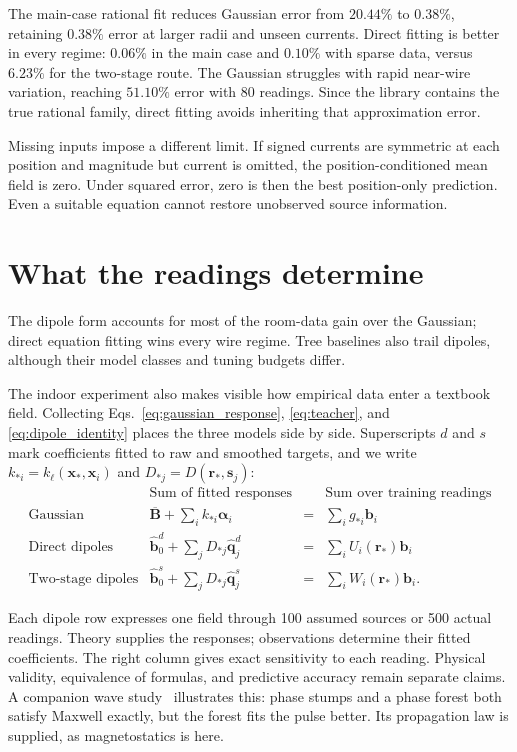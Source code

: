 \documentclass[11pt]{article}
\newcommand{\B}{\mathbf B}
\newcommand{\x}{\mathbf x}
\newcommand{\rr}{\mathbf r}
\newcommand{\bvec}{\mathbf b}
\begin{document}
The main-case rational fit reduces Gaussian error from \(20.44\%\) to
\(0.38\%\), retaining \(0.38\%\) error at larger radii and unseen currents.
Direct fitting is better in every regime: \(0.06\%\) in the main case and
\(0.10\%\) with sparse data, versus \(6.23\%\) for the two-stage route.
The Gaussian struggles with rapid near-wire variation, reaching \(51.10\%\)
error with 80 readings. Since the library contains the true rational family,
direct fitting avoids inheriting that approximation error.

Missing inputs impose a different limit. If signed currents are symmetric at
each position and magnitude but current is omitted, the position-conditioned
mean field is zero. Under squared error, zero is then the best position-only
prediction. Even a suitable equation cannot restore unobserved source information.

\section{What the readings determine}

The dipole form accounts for most of the room-data gain over the Gaussian;
direct equation fitting wins every wire regime. Tree baselines also trail
dipoles, although their model classes and tuning budgets differ.

The indoor experiment also makes visible how empirical data enter a textbook
field. Collecting Eqs.~\eqref{eq:gaussian_response}, \eqref{eq:teacher}, and
\eqref{eq:dipole_identity} places the three models side by side. Superscripts
\(d\) and \(s\) mark coefficients fitted to raw and smoothed targets, and we
write \(k_{*i}=k_\ell(\x_*,\x_i)\) and \(D_{*j}=D(\rr_*,\mathbf s_j)\):
\[
\begin{array}{lccc}
 & \text{Sum of fitted responses} && \text{Sum over training readings}\\[3pt]
\text{Gaussian} &
\displaystyle\overline{\B}+\sum_i k_{*i}\boldsymbol\alpha_i
&=& \displaystyle\sum_i g_{*i}\bvec_i\\[7pt]
\text{Direct dipoles} &
\displaystyle\widehat{\bvec}_0^d+\sum_j D_{*j}\widehat{\mathbf q}_j^d
&=& \displaystyle\sum_i U_i(\rr_*)\bvec_i\\[7pt]
\text{Two-stage dipoles} &
\displaystyle\widehat{\bvec}_0^s+\sum_j D_{*j}\widehat{\mathbf q}_j^s
&=& \displaystyle\sum_i W_i(\rr_*)\bvec_i .
\end{array}
\]
\par
Each dipole row expresses one field through 100 assumed sources or 500 actual
readings. Theory supplies the responses; observations determine their fitted
coefficients. The right column gives exact sensitivity to each reading.
Physical validity, equivalence of formulas, and predictive accuracy remain
separate claims. A companion wave study~\cite{stumps} illustrates this:
phase stumps and a phase forest both satisfy Maxwell exactly, but the forest
fits the pulse better. Its propagation law is supplied, as magnetostatics is here.
\end{document}
